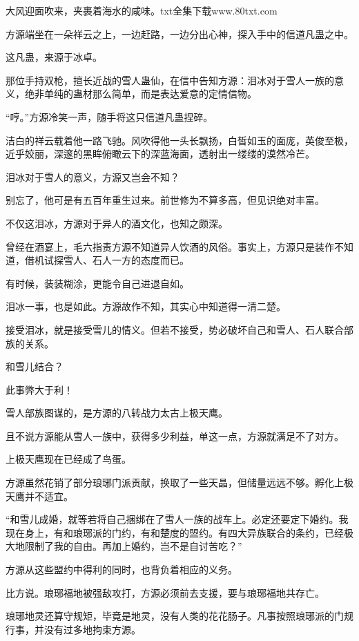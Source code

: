 
\begin{this_body}

大风迎面吹来，夹裹着海水的咸味。txt全集下载www.80txt.com

方源端坐在一朵祥云之上，一边赶路，一边分出心神，探入手中的信道凡蛊之中。

这凡蛊，来源于冰卓。

那位手持双枪，擅长近战的雪人蛊仙，在信中告知方源：泪冰对于雪人一族的意义，绝非单纯的蛊材那么简单，而是表达爱意的定情信物。

“哼。”方源冷笑一声，随手将这只信道凡蛊捏碎。

洁白的祥云载着他一路飞驰。风吹得他一头长飘扬，白皙如玉的面庞，英俊至极，近乎姣丽，深邃的黑眸俯瞰云下的深蓝海面，透射出一缕缕的漠然冷芒。

泪冰对于雪人的意义，方源又岂会不知？

别忘了，他可是有五百年重生过来。前世修为不算多高，但见识绝对丰富。

不仅这泪冰，方源对于异人的酒文化，也知之颇深。

曾经在酒宴上，毛六指责方源不知道异人饮酒的风俗。事实上，方源只是装作不知道，借机试探雪人、石人一方的态度而已。

有时候，装装糊涂，更能令自己进退自如。

泪冰一事，也是如此。方源故作不知，其实心中知道得一清二楚。

接受泪冰，就是接受雪儿的情义。但若不接受，势必破坏自己和雪人、石人联合部族的关系。

和雪儿结合？

此事弊大于利！

雪人部族图谋的，是方源的八转战力太古上极天鹰。

且不说方源能从雪人一族中，获得多少利益，单这一点，方源就满足不了对方。

上极天鹰现在已经成了鸟蛋。

方源虽然花销了部分琅琊门派贡献，换取了一些天晶，但储量远远不够。孵化上极天鹰并不适宜。

“和雪儿成婚，就等若将自己捆绑在了雪人一族的战车上。必定还要定下婚约。我现在身上，有和琅琊派的门约，有和楚度的盟约。有四大异族联合的条约，已经极大地限制了我的自由。再加上婚约，岂不是自讨苦吃？”

方源从这些盟约中得利的同时，也背负着相应的义务。

比方说。琅琊福地被强敌攻打，方源必须前去支援，要与琅琊福地共存亡。

琅琊地灵还算守规矩，毕竟是地灵，没有人类的花花肠子。凡事按照琅琊派的门规行事，并没有过多地拘束方源。


\end{this_body}
